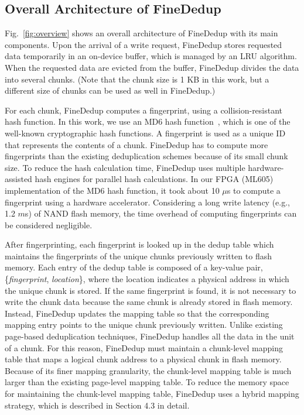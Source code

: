 \subsection{Overall Architecture of FineDedup}

Fig.~\ref{fig:overview} shows an overall architecture of FineDedup with its main components.
Upon the arrival of a write request,
FineDedup stores requested data temporarily in an on-device buffer,
which is managed by an LRU algorithm.
When the requested data are evicted from the buffer,
FineDedup divides the data into several chunks.
(Note that the chunk size is 1 KB in this work, 
but a different size of chunks can be used as well in FineDedup.)

For each chunk, FineDedup computes a fingerprint, using a collision-resistant hash function.
In this work, we use an MD6 hash function~\cite{md6}, which is one of the well-known cryptographic hash functions.
A fingerprint is used as a unique ID that represents the contents of a chunk.
FineDedup has to compute more fingerprints than the existing deduplication schemes
because of its small chunk size.
To reduce the hash calculation time,
FineDedup uses multiple hardware-assisted hash engines for parallel hash calculations. 
In our FPGA (ML605) implementation of the MD6 hash function, it took about 10 $\mu$s to compute a fingerprint using a hardware accelerator.
Considering a long write latency (e.g., 1.2 $m$s) of NAND flash memory,
the time overhead of computing fingerprints can be considered negligible.

After fingerprinting, 
each fingerprint is looked up in the dedup table
which maintains the fingerprints of the unique chunks previously written to flash memory.
Each entry of the dedup table is composed of a key-value pair, \{\textit{fingerprint}, \textit{location}\},
where the location indicates a physical address in which the unique chunk is stored.
If the same fingerprint is found,
it is not necessary to write the chunk data
because the same chunk is already stored in flash memory.
Instead, FineDedup updates the mapping table 
so that the corresponding mapping entry points to the unique chunk previously written.
Unlike existing page-based deduplication techniques,
FineDedup handles all the data in the unit of a chunk.
For this reason, FineDedup must maintain a chunk-level mapping table
that maps a logical chunk address to a physical chunk in flash memory.
Because of its finer mapping granularity,
the chunk-level mapping table is much larger than the existing page-level mapping table.
To reduce the memory space for maintaining the chunk-level mapping table,
FineDedup uses a hybrid mapping strategy,
which is described in Section 4.3 in detail.

